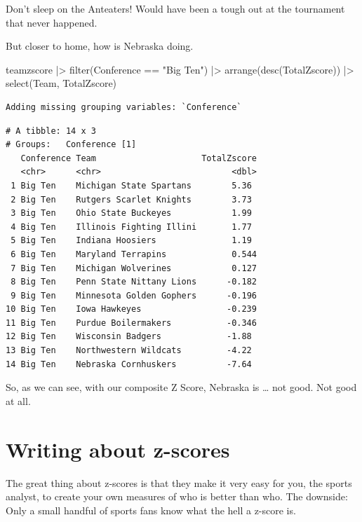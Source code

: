 \documentclass[
  letterpaper,
  DIV=11,
  numbers=noendperiod]{scrreprt}
\newenvironment{Shaded}{\begin{snugshade}}{\end{snugshade}}
\newcommand{\FunctionTok}[1]{\textcolor[rgb]{0.28,0.35,0.67}{#1}}
\newcommand{\NormalTok}[1]{\textcolor[rgb]{0.00,0.23,0.31}{#1}}
\newcommand{\SpecialCharTok}[1]{\textcolor[rgb]{0.37,0.37,0.37}{#1}}
\newcommand{\StringTok}[1]{\textcolor[rgb]{0.13,0.47,0.30}{#1}}
\begin{document}
Don't sleep on the Anteaters! Would have been a tough out at the
tournament that never happened.

But closer to home, how is Nebraska doing.

\begin{Shaded}
\begin{Highlighting}[]
\NormalTok{teamzscore }\SpecialCharTok{|\textgreater{}} 
  \FunctionTok{filter}\NormalTok{(Conference }\SpecialCharTok{==} \StringTok{"Big Ten"}\NormalTok{) }\SpecialCharTok{|\textgreater{}} 
  \FunctionTok{arrange}\NormalTok{(}\FunctionTok{desc}\NormalTok{(TotalZscore)) }\SpecialCharTok{|\textgreater{}}
  \FunctionTok{select}\NormalTok{(Team, TotalZscore)}
\end{Highlighting}
\end{Shaded}

\begin{verbatim}
Adding missing grouping variables: `Conference`
\end{verbatim}

\begin{verbatim}
# A tibble: 14 x 3
# Groups:   Conference [1]
   Conference Team                     TotalZscore
   <chr>      <chr>                          <dbl>
 1 Big Ten    Michigan State Spartans        5.36 
 2 Big Ten    Rutgers Scarlet Knights        3.73 
 3 Big Ten    Ohio State Buckeyes            1.99 
 4 Big Ten    Illinois Fighting Illini       1.77 
 5 Big Ten    Indiana Hoosiers               1.19 
 6 Big Ten    Maryland Terrapins             0.544
 7 Big Ten    Michigan Wolverines            0.127
 8 Big Ten    Penn State Nittany Lions      -0.182
 9 Big Ten    Minnesota Golden Gophers      -0.196
10 Big Ten    Iowa Hawkeyes                 -0.239
11 Big Ten    Purdue Boilermakers           -0.346
12 Big Ten    Wisconsin Badgers             -1.88 
13 Big Ten    Northwestern Wildcats         -4.22 
14 Big Ten    Nebraska Cornhuskers          -7.64 
\end{verbatim}

So, as we can see, with our composite Z Score, Nebraska is \ldots{} not
good. Not good at all.

\hypertarget{writing-about-z-scores}{%
\section{Writing about z-scores}\label{writing-about-z-scores}}

The great thing about z-scores is that they make it very easy for you,
the sports analyst, to create your own measures of who is better than
who. The downside: Only a small handful of sports fans know what the
hell a z-score is.
\end{document}
